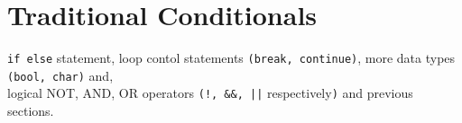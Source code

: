 \documentclass[../../Problems]{subfiles}
\begin{document}
\section{Traditional Conditionals}
\begin{topics}
\verb!if else! statement, loop contol statements \verb!(break, continue)!, more data types \verb!(bool, char)! and, \\logical NOT, AND, OR operators \verb#(!, &&, ||# respectively\verb!)! and previous sections.
\end{topics}




\end{document}
